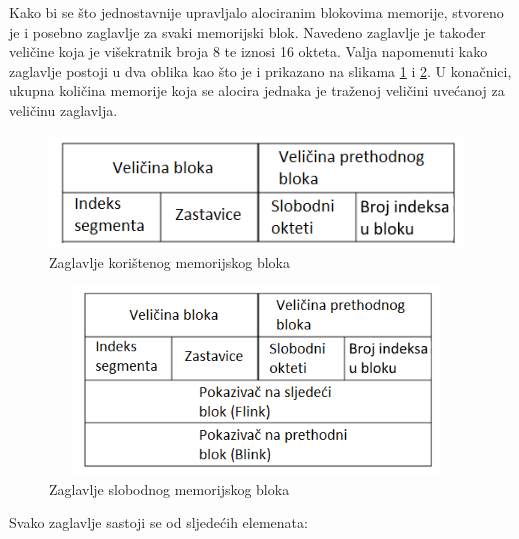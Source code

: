 \documentclass[times, utf8, diplomski, numeric]{fer}
\begin{document}
Kako bi se što jednostavnije upravljalo alociranim blokovima
memorije, stvoreno je i posebno zaglavlje za svaki memorijski
blok. Navedeno zaglavlje je također veličine koja je višekratnik
broja 8 te iznosi 16 okteta. Valja napomenuti kako zaglavlje
postoji u dva oblika kao što je i prikazano na slikama 
\ref{fig:used_heap_block} i \ref{fig:free_heap_block}. U
konačnici, ukupna količina memorije koja se alocira jednaka je
traženoj veličini uvećanoj za veličinu zaglavlja.				%


\begin{figure}[!ht]
\centering
\setlength\fboxsep{0pt}
\setlength\fboxrule{0.5pt}
\includegraphics[width=11cm, height=3cm]{slike/used_heap_block}
\caption{Zaglavlje korištenog memorijskog bloka}
\label{fig:used_heap_block} 
\end{figure}

\begin{figure}[!ht]
\centering
\setlength\fboxsep{0pt}
\setlength\fboxrule{0.5pt}
\includegraphics[width=11cm, height=5cm]{slike/free_heap_block}
\caption{Zaglavlje slobodnog memorijskog bloka}
\label{fig:free_heap_block} 
\end{figure}

Svako zaglavlje sastoji se od sljedećih elemenata:
\end{document}
